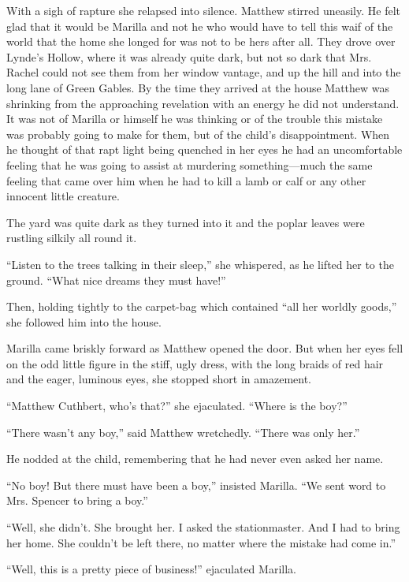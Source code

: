 \documentclass[a4paper]{article}
\begin{document}
\Huge{With a sigh of rapture she relapsed into silence. Matthew stirred uneasily. He felt glad that it would be Marilla and not he who would have to tell this waif of the world that the home she longed for was not to be hers after all. They drove over Lynde's Hollow, where it was already quite dark, but not so dark that Mrs. Rachel could not see them from her window vantage, and up the hill and into the long lane of Green Gables. By the time they arrived at the house Matthew was shrinking from the approaching revelation with an energy he did not understand. It was not of Marilla or himself he was thinking or of the trouble this mistake was probably going to make for them, but of the child's disappointment. When he thought of that rapt light being quenched in her eyes he had an uncomfortable feeling that he was going to assist at murdering something---much the same feeling that came over him when he had to kill a lamb or calf or any other innocent little creature.}

{\tiny The yard was quite dark as they turned into it and the poplar leaves were rustling silkily all round it.

``Listen to the trees talking in their sleep,'' she whispered, as he lifted her to the ground. ``What nice dreams they must have!''

Then, holding tightly to the carpet-bag which contained ``all her worldly goods,'' she followed him into the house.}


{\scriptsize Marilla came briskly forward as Matthew opened the door. But when her eyes fell on the odd little figure in the stiff, ugly dress, with the long braids of red hair and the eager, luminous eyes, she stopped short in amazement.

``Matthew Cuthbert, who's that?'' she ejaculated. ``Where is the boy?''

``There wasn't any boy,'' said Matthew wretchedly. ``There was only her.''}

{\footnotesize He nodded at the child, remembering that he had never even asked her name.

``No boy! But there must have been a boy,'' insisted Marilla. ``We sent word to Mrs. Spencer to bring a boy.''

``Well, she didn't. She brought her. I asked the stationmaster. And I had to bring her home. She couldn't be left there, no matter where the mistake had come in.''

``Well, this is a pretty piece of business!'' ejaculated Marilla.}
\end{document}
